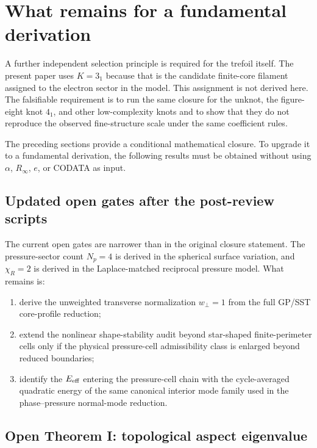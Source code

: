\documentclass[11pt]{article}
\begin{document}
\section{What remains for a fundamental derivation}

A further independent selection principle is required for the trefoil itself.
The present paper uses \(K=3_1\) because that is the candidate finite-core
filament assigned to the electron sector in the model.  This assignment is not
derived here.  The falsifiable requirement is to run the same closure for the
unknot, the figure-eight knot \(4_1\), and other low-complexity knots and to
show that they do not reproduce the observed fine-structure scale under the
same coefficient rules.

\label{sec:fundamental}

The preceding sections provide a conditional mathematical closure.  To upgrade it to a
fundamental derivation, the following results must be obtained without using \(\alpha\),
\(R_\infty\), \(e\), or CODATA as input.


\subsection{Updated open gates after the post-review scripts}

The current open gates are narrower than in the original closure statement.
The pressure-sector count \(N_p=4\) is derived in the spherical surface
variation, and \(\chi_R=2\) is derived in the Laplace-matched reciprocal
pressure model.  What remains is:
\begin{enumerate}[label=(G\arabic*)]
\item derive the unweighted transverse normalization \(w_\perp=1\) from the
full GP/SST core-profile reduction;
\item extend the nonlinear shape-stability audit beyond star-shaped finite-perimeter cells only if the physical pressure-cell admissibility class is enlarged beyond reduced boundaries;
\item identify the \(E_{\rm eff}\) entering the pressure-cell chain with the
cycle-averaged quadratic energy of the same canonical interior mode family used
in the phase--pressure normal-mode reduction.
\end{enumerate}

\subsection{Open Theorem I: topological aspect eigenvalue}
\end{document}
